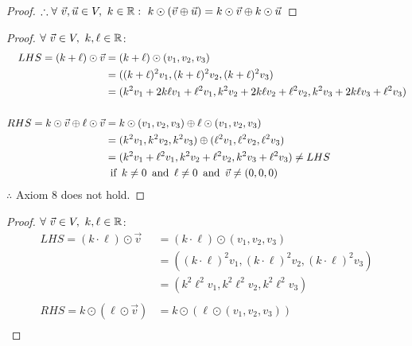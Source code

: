 \begin{enumerate}
\begin{proof}
    $\therefore \forall~\vec{v},\vec{u} \in V,~k \in \mathbb{R}:~k \odot (\vec{v} \oplus \vec{u}) = k \odot \vec{v} \oplus k \odot \vec{u}$
  \end{proof}
  \begin{proof}
    $\forall~\vec{v} \in V,~k,\ell \in \mathbb{R}$:
    \begin{align*}
      LHS = (k+\ell) \odot \vec{v}                    & = (k+\ell) \odot (v_1,v_2,v_3)                                                          \\
                                                      & = ((k+\ell)^2v_1,(k+\ell)^2v_2,(k+\ell)^2v_3)                                           \\
                                                      & = (k^2v_1+2k\ell v_1+\ell^2v_1,k^2v_2+2k\ell v_2+\ell^2v_2,k^2v_3+2k\ell v_3+\ell^2v_3) \\ \\
      RHS = k \odot \vec{v} \oplus \ell \odot \vec{v} & = k \odot (v_1,v_2,v_3) \oplus \ell \odot (v_1,v_2,v_3)                                 \\
                                                      & = (k^2v_1,k^2v_2,k^2v_3) \oplus (\ell^2v_1,\ell^2v_2,\ell^2v_3)                         \\
                                                      & = (k^2v_1 + \ell^2v_1, k^2v_2 + \ell^2v_2, k^2v_3 + \ell^2v_3) \neq LHS                 \\
                                                      & \operatorname{~\text{if}~} k \neq 0 \operatorname{~\text{and}~} \ell \neq 0 \operatorname{~\text{and}~} \vec{v} \neq (0,0,0)
    \end{align*}
    $\therefore$ Axiom 8 does not hold.
  \end{proof}
  \begin{proof}
    $\forall~\vec{v} \in V,~k,\ell \in \mathbb{R}$:
    \begin{align*}
      LHS = (k \cdot \ell) \odot \vec{v} & = (k \cdot \ell) \odot (v_1,v_2,v_3)                              \\
                                         & = ((k \cdot \ell)^2v_1, (k \cdot \ell)^2v_2, (k \cdot \ell)^2v_3) \\
                                         & = (k^2\ell^2v_1,k^2\ell^2v_2,k^2\ell^2v_3)                        \\ \\
      RHS = k \odot (\ell \odot \vec{v}) & = k \odot (\ell \odot (v_1,v_2,v_3))                              \\

\end{align*}
\end{proof}
\end{enumerate}
